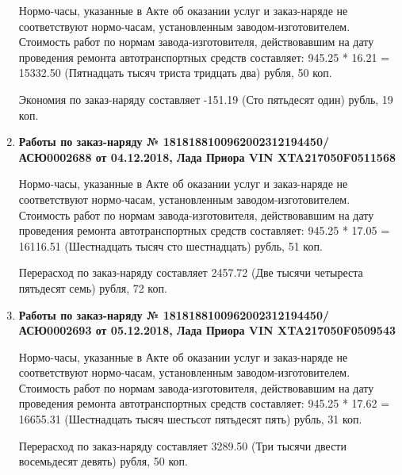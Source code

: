 \begin{enumerate}

Нормо-часы, указанные в Акте об оказании услуг и заказ-наряде не соответствуют нормо-часам,  установленным заводом-изготовителем.\\
Стоимость работ по нормам завода-изготовителя, действовавшим на дату проведения ремонта автотранспортных средств составляет: 945.25 * 16.21  = 15332.50 (Пятнадцать тысяч триста тридцать два) рубля, 50 коп.

Экономия  по заказ-наряду составляет -151.19 (Сто пятьдесят один) рубль, 19 коп.  
\vspace{3mm}





\item \par\textbf{{Работы по заказ-наряду    № 1818188100962002312194450/\-АСЮ0002688 от 04.12.2018, Лада Приора  VIN  XTA217050F0511568
}}


Нормо-часы, указанные в Акте об оказании услуг и заказ-наряде не соответствуют нормо-часам,  установленным заводом-изготовителем.\\
Стоимость работ по нормам завода-изготовителя, действовавшим на дату проведения ремонта автотранспортных средств составляет: 945.25 * 17.05  = 16116.51 (Шестнадцать тысяч сто шестнадцать) рубль, 51 коп.

Перерасход  по заказ-наряду составляет 2457.72 (Две тысячи четыреста пятьдесят семь) рубля, 72 коп.  
\vspace{3mm}






\item \par\textbf{{Работы по заказ-наряду    № 1818188100962002312194450/\-АСЮ0002693 от 05.12.2018, Лада Приора  VIN  XTA217050F0509543
}}



Нормо-часы, указанные в Акте об оказании услуг и заказ-наряде не соответствуют нормо-часам,  установленным заводом-изготовителем.\\
Стоимость работ по нормам завода-изготовителя, действовавшим на дату проведения ремонта автотранспортных средств составляет: 945.25 * 17.62  = 16655.31 (Шестнадцать тысяч шестьсот пятьдесят пять) рубль, 31 коп.

Перерасход  по заказ-наряду составляет 3289.50 (Три тысячи двести восемьдесят девять) рубля, 50 коп.  
\vspace{3mm}


\end{enumerate}
